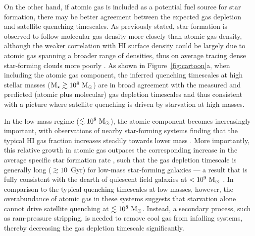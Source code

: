 \documentclass[usenatbib]{mn2e}
\newcommand{\mstar}{{\rm M}_{\star}}
\newcommand{\msun}{{\rm M}_{\odot}}
\begin{document}
On the other hand, if atomic gas is included as a potential fuel
source for star formation, there may be better agreement between the
expected gas depletion and satellite quenching timescales. As
previously stated, star formation is observed to follow molecular gas
density more closely than atomic gas density, although the weaker
correlation with H{\scriptsize I} surface density could be largely due
to atomic gas spanning a broader range of densities, thus on average
tracing dense star-forming clouds more poorly \citep{glover12a,
  glover12b, clark12}. As shown in Figure~\ref{fig:cartoon}a, when
including the atomic gas component, the inferred quenching timescales
at high stellar masses ($\mstar \gtrsim 10^{8}~\msun$) are in broad
agreement with the measured and predicted (atomic plus molecular) gas
depletion timescales and thus consistent with a picture where
satellite quenching is driven by starvation at high masses.



In the low-mass regime ($\lesssim10^{8}~\msun$), the atomic component
becomes increasingly important, with observations of nearby
star-forming systems finding that the typical H{\scriptsize I} gas
fraction increases steadily towards lower mass \citep{skillman03,
  geha06, leroy08, schiminovich10, catinella10, huang12}. More
importantly, this relative growth in atomic gas outpaces the
corresponding increase in the average specific star formation rate
\citep[e.g.][]{noeske07, salim07, speagle14}, such that the gas
depletion timescale is generally long ($\gtrsim 10$~Gyr) for low-mass
star-forming galaxies --- a result that is fully consistent with the
dearth of quiescent field galaxies at $<10^{9}~\msun$ \citep{geha12,
  onorbe15}. In comparison to the typical quenching timescales at low
masses, however, the overabundance of atomic gas in these systems
suggests that starvation alone cannot drive satellite quenching at
$\lesssim10^{8}~\msun$. Instead, a secondary process, such as
ram-pressure stripping, is needed to remove cool gas from infalling
systems, thereby decreasing the gas depletion timescale significantly.
\end{document}

